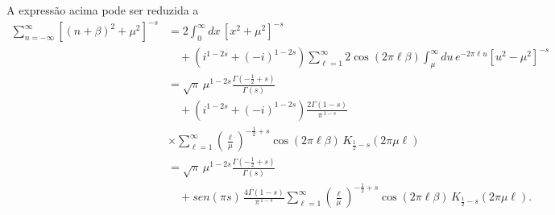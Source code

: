 A expressão acima pode ser reduzida a
\begin{equation}
\begin{aligned}
\sum_{n=-\infty}^{\infty} \left[(n+\beta)^2+\mu^2\right]^{-s}
&=
2\int_{0}^{\infty} dx \,\left[x^2+\mu^2\right]^{-s}
\\[4pt]
&\quad
+
\left(i^{1-2s}+(-i)^{1-2s}\right)
\sum_{\ell=1}^{\infty}
2\cos(2\pi \ell \beta)
\int_{\mu}^{\infty} du \, e^{-2\pi \ell u}\left[u^2-\mu^2\right]^{-s}
\\[6pt]
&=
\sqrt{\pi}\,\mu^{1-2s}
\frac{\Gamma\!\left(-\frac{1}{2}+s\right)}{\Gamma(s)}
\\[4pt]
&\quad
+
\left(i^{1-2s}+(-i)^{1-2s}\right)
\frac{2\Gamma(1-s)}{\pi^{\,1-s}} \\
& \times \sum_{\ell=1}^{\infty}
\left(\frac{\ell}{\mu}\right)^{-\frac{1}{2}+s}
\cos(2\pi \ell \beta)\,
K_{\frac{1}{2}-s}(2\pi \mu \ell)
\\[6pt]
&=
\sqrt{\pi}\,\mu^{1-2s}
\frac{\Gamma\!\left(-\frac{1}{2}+s\right)}{\Gamma(s)}
\\[4pt]
&\quad
+
sen(\pi s)\,
\frac{4\Gamma(1-s)}{\pi^{\,1-s}}
\sum_{\ell=1}^{\infty}
\left(\frac{\ell}{\mu}\right)^{-\frac{1}{2}+s}
\cos(2\pi \ell \beta)\,
K_{\frac{1}{2}-s}(2\pi \mu \ell).
\end{aligned}
\tag{A7}
\label{eq:A7}
\end{equation}
